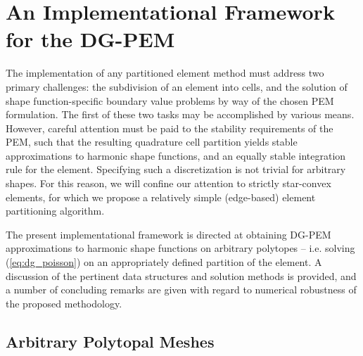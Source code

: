 \chapter{An Implementational Framework \\ for the DG-PEM} \label{ch:implementation}
%
The implementation of any partitioned element method must address two primary challenges: the subdivision of an element into cells, and the solution of shape function-specific boundary value problems by way of the chosen PEM formulation. The first of these two tasks may be accomplished by various means. However, careful attention must be paid to the stability requirements of the PEM, such that the resulting quadrature cell partition yields stable approximations to harmonic shape functions, and an equally stable integration rule for the element. Specifying such a discretization is not trivial for arbitrary shapes. For this reason, we will confine our attention to strictly star-convex elements, for which we propose a relatively simple (edge-based) element partitioning algorithm.

The present implementational framework is directed at obtaining DG-PEM approximations to harmonic shape functions on arbitrary polytopes -- i.e. solving (\ref{eq:dg_poisson}) on an appropriately defined partition of the element. A discussion of the pertinent data structures and solution methods is provided, and a number of concluding remarks are given with regard to numerical robustness of the proposed methodology.

\section{Arbitrary Polytopal Meshes}

